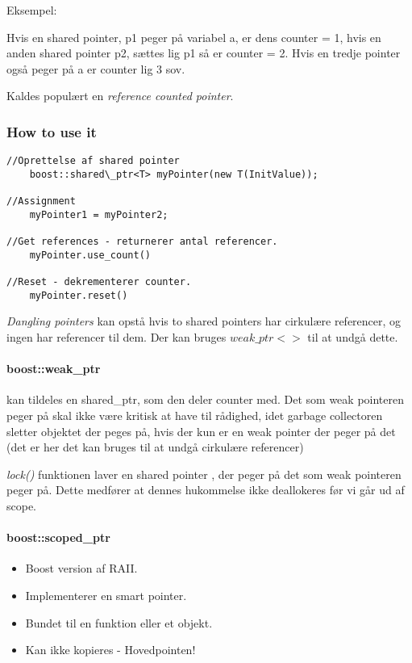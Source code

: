 Eksempel:

Hvis en shared pointer, p1 peger på variabel a, er dens counter = 1, hvis en anden shared pointer p2, sættes lig p1 så er counter = 2. Hvis en tredje pointer også peger på a er counter lig 3 sov.

Kaldes populært en \textit{reference counted pointer}.

\subsubsection{How to use it}
\begin{lstlisting}[caption=Eksempel på brugen af en shared pointer, label=usOfSharedPtr]
//Oprettelse af shared pointer
	boost::shared\_ptr<T> myPointer(new T(InitValue));

//Assignment
	myPointer1 = myPointer2;
	
//Get references - returnerer antal referencer.
	myPointer.use_count()

//Reset - dekrementerer counter.
	myPointer.reset()
\end{lstlisting}

\textit{Dangling pointers} kan opstå hvis to shared pointers har cirkulære referencer, og ingen har referencer til dem. Der kan bruges $weak\_ptr<>$ til at undgå dette.

\paragraph{boost::weak\_ptr}
kan tildeles en shared\_ptr, som den deler counter med.
Det som weak pointeren peger på skal ikke være kritisk at have til rådighed, idet garbage collectoren sletter objektet der peges på, hvis der kun er en weak pointer der peger på det (det er her det kan bruges til at undgå cirkulære referencer)

\textit{lock()} funktionen laver en shared pointer , der peger på det som weak pointeren peger på. Dette medfører at dennes hukommelse ikke deallokeres før vi går ud af scope.

\paragraph{boost::scoped\_ptr}
\begin{itemize}
	\item Boost version af RAII.
	\item Implementerer en smart pointer.
	\item Bundet til en funktion eller et objekt.
	\item Kan ikke kopieres - Hovedpointen!
\end{itemize}
